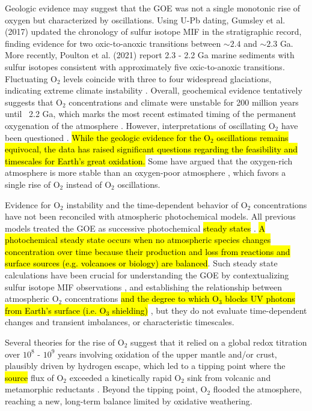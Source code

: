 \documentclass[9pt,twocolumn,twoside,lineno]{pnas-new}
\begin{document}
Geologic evidence may suggest that the GOE was not a single monotonic rise of oxygen but characterized by oscillations. Using U-Pb dating, Gumsley et al. (2017) \cite{Gumsley_2017} updated the chronology of sulfur isotope MIF in the stratigraphic record, finding evidence for two oxic-to-anoxic transitions between $\sim 2.4$ and $\sim 2.3$ Ga. More recently, Poulton et al. (2021) \cite{Poulton_2021} report 2.3 - 2.2 Ga marine sediments with sulfur isotopes consistent with approximately five oxic-to-anoxic transitions. Fluctuating O$_2$ levels coincide with three to four widespread glaciations, indicating extreme climate instability \cite{Rasmussen_2013}. Overall, geochemical evidence tentatively suggests that O$_2$ concentrations and climate were unstable for 200 million years until ~2.2 Ga, which marks the most recent estimated timing of the permanent oxygenation of the atmosphere \cite{Poulton_2021}. However, interpretations of oscillating O$_2$ have been questioned \cite{Izon_2022}. \hl{While the geologic evidence for the O$_2$ oscillations remains equivocal, the data has raised significant questions regarding the feasibility and timescales for Earth's great oxidation.} Some have argued that the oxygen-rich atmosphere is more stable than an oxygen-poor atmosphere \cite{Goldblatt_2006}, which favors a single rise of O$_2$ instead of O$_2$ oscillations.

Evidence for O$_2$ instability and the time-dependent behavior of O$_2$ concentrations have not been reconciled with atmospheric photochemical models. All previous models treated the GOE as successive photochemical \hl{steady states} \cite{Kasting_1980,Segura_2003,Pavlov_2001,Pavlov_2002,Zahnle_2006,Bethan_2021,Claire_2014,Izon_2017,Kurzweil_2013}. \hl{A photochemical steady state occurs when no atmospheric species changes concentration over time because their production and loss from reactions and surface sources (e.g. volcanoes or biology) are balanced}. Such steady state calculations have been crucial for understanding the GOE by contextualizing sulfur isotope MIF observations \cite{Pavlov_2002,Zahnle_2006}, and establishing the relationship between atmospheric O$_2$ concentrations \hl{and the degree to which O$_3$ blocks UV photons from Earth's surface (i.e. O$_3$ shielding)} \cite{Kasting_1980,Pavlov_2001,Bethan_2021}, but they do not evaluate time-dependent changes and transient imbalances, or characteristic timescales.

Several theories for the rise of O$_2$ suggest that it relied on a global redox titration over $10^8$ - $10^9$ years involving oxidation of the upper mantle and/or crust, plausibly driven by hydrogen escape, which led to a tipping point where the \hl{source} flux of O$_2$ exceeded a kinetically rapid O$_2$ sink from volcanic and metamorphic reductants \cite{Catling_2001,Claire_2006,Kadoya_2020,Holland_2002,Kasting_1993}. Beyond the tipping point, O$_2$ flooded the atmosphere, reaching a new, long-term balance limited by oxidative weathering. 
\end{document}
